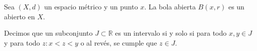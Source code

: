 \documentclass{./Topologia.tex}
\begin{document}
\begin{teorema}
	Sea $(X,d)$ un espacio métrico y un punto $x$. La bola abierta
	$B(x,r)$ es un abierto en $X$.
\end{teorema}
\begin{defin}
	Decimos que un subconjunto $J \subset \mathbb{R}$ es un intervalo
	si y solo si para todo $x,y \in J$ y para todo $z: x < z < y$ o
	al revés, se cumple que $z \in J$.
\end{defin}
\end{document}
